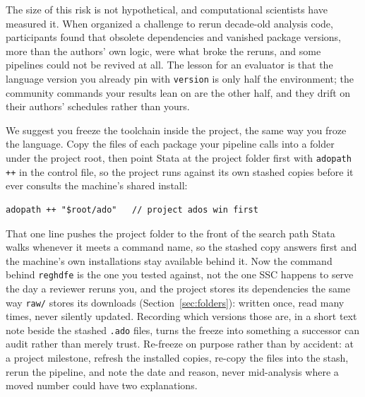 The size of this risk is not hypothetical, and computational scientists have measured it. When \textcite{perkel2020code} organized a challenge to rerun decade-old analysis code, participants found that obsolete dependencies and vanished package versions, more than the authors' own logic, were what broke the reruns, and some pipelines could not be revived at all. The lesson for an evaluator is that the language version you already pin with \texttt{version} is only half the environment; the community commands your results lean on are the other half, and they drift on their authors' schedules rather than yours.

We suggest you freeze the toolchain inside the project, the same way you froze the language. Copy the files of each package your pipeline calls into a folder under the project root, then point Stata at the project folder first with \texttt{adopath ++} in the control file, so the project runs against its own stashed copies before it ever consults the machine's shared install:
\par
{\footnotesize
\begin{verbatim}
adopath ++ "$root/ado"   // project ados win first
\end{verbatim}
}
That one line pushes the project folder to the front of the search path Stata walks whenever it meets a command name, so the stashed copy answers first and the machine's own installations stay available behind it. Now the command behind \texttt{reghdfe} is the one you tested against, not the one SSC happens to serve the day a reviewer reruns you, and the project stores its dependencies the same way \texttt{raw/} stores its downloads (Section~\ref{sec:folders}): written once, read many times, never silently updated. Recording which versions those are, in a short text note beside the stashed \texttt{.ado} files, turns the freeze into something a successor can audit rather than merely trust. Re-freeze on purpose rather than by accident: at a project milestone, refresh the installed copies, re-copy the files into the stash, rerun the pipeline, and note the date and reason, never mid-analysis where a moved number could have two explanations.

